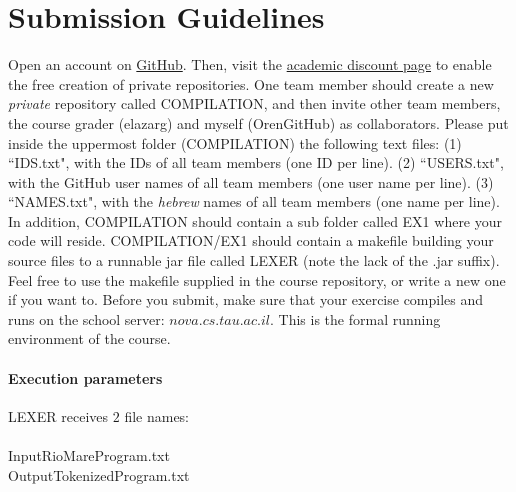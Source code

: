 \documentclass{article}
\begin{document}
\section{Submission Guidelines}
Open an account on \href{https://github.com/}{GitHub}.
Then, visit the
\href{https://education.github.com/discount_requests/new}{academic discount page}
to enable the free creation of private repositories.
One team member should create a new \textit{private} repository called COMPILATION,
and then invite other team members, the course grader (elazarg) and myself (OrenGitHub)
as collaborators.
Please put inside the uppermost folder (COMPILATION) the following text files:
(1) ``IDS.txt", with the IDs of all team members (one ID per line).
(2) ``USERS.txt", with the GitHub user names of all team members (one user name per line).
(3) ``NAMES.txt", with the \textit{hebrew} names of all team members (one name per line).
In addition, COMPILATION should contain a sub folder called EX1
where your code will reside.
COMPILATION/EX1 should contain a makefile building your source files to a
runnable jar file called LEXER (note the lack of the .jar suffix).
Feel free to use the makefile supplied in the course repository,
or write a new one if you want to. 
Before you submit, make sure that your exercise compiles and runs
on the school server: $nova.cs.tau.ac.il$.
This is the formal running environment of the course.
\paragraph{Execution parameters}
LEXER receives $2$ file names:\\ \\
InputRioMareProgram.txt\\
OutputTokenizedProgram.txt
\end{document}
